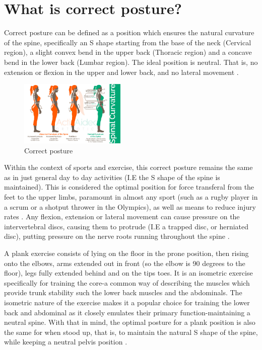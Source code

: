 \documentclass[sigconf]{acmart}
\begin{document}
\section{What is correct posture? }
Correct posture can be defined as a position which ensures the natural curvature of the spine, specifically an  \textquotesingle S \textquotesingle shape starting from the base of the neck (Cervical region), a slight convex bend in the upper back (Thoracic region) and a concave bend in the lower back (Lumbar region).  The ideal position is neutral. That is, no extension or flexion in the upper and lower back, and no lateral movement \cite{activaided}.

\begin{figure}[h]
\centering
\includegraphics[width=0.45\textwidth, scale=1]{CorrectPosture.png}
\caption{Correct posture \cite{activaided} }
\end{figure}


Within the context of sports and exercise, this correct posture remains the same as in just general day to day activities (I.E the S shape of the spine is maintained). This is considered the optimal position for force transferal from the feet to the upper limbs, paramount in almost any sport (such as a rugby player in a scrum or a shotput thrower in the Olympics), as well as means to reduce injury rates \cite{videman1997lifetime}.  Any flexion, extension or lateral movement can cause pressure on the intervertebral discs, causing them to protrude (I.E a trapped disc, or herniated disc), putting pressure on the nerve roots running throughout the spine \cite{videman1997lifetime}. 

A plank exercise consists of lying on the floor in the prone position, then rising onto the elbows, arms extended out in front (so the elbow is 90 degrees to the floor), legs fully extended behind and on the tips toes. It is an isometric exercise specifically for training the core{-}a common way of describing the muscles which provide trunk stability such the lower back muscles and the abdominals.  The isometric nature of the exercise makes it a popular choice for training the lower back and abdominal as it closely emulates their primary function{-}maintaining a neutral spine. With that in mind, the optimal posture for a plank position is also the same for when stood up, that is, to maintain the natural S shape of the spine, while keeping a neutral pelvis position \cite{cortell2017influence}.
\end{document}
